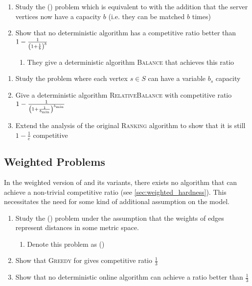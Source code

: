 \begin{enumerate}
    \item Study the \ombmatch{} \textsf{(\ombm{})} problem which is equivalent to \omm{} with the addition that the server vertices now have a capacity $b$ (i.e.\! they can be matched $b$ times)
    \item Show that no deterministic algorithm has a competitive ratio better than $1 - \frac{1}{\left( 1 + \frac{1}{b} \right)^b}$ 
    \begin{enumerate}
        \item They give a deterministic algorithm \textsc{Balance} that achieves this ratio
    \end{enumerate}
\end{enumerate}

\begin{enumerate}
    \item Study the \ombm{} problem where each vertex $s \in S$ can have a variable $b_s$ capacity
    \item Give a deterministic algorithm \textsc{RelativeBalance} with competitive ratio $1 - \frac{1}{\left( 1 + \frac{1}{b_{\min}} \right)^{b_{\min}}}$
    \item Extend the analysis of the original \textsc{Ranking} algorithm to show that it is still $1 - \frac{1}{e}$ competitive 
\end{enumerate}

\subsection{Weighted Problems}

In the weighted version of \omm{} and its \bmatch{} variants, there exists no algorithm that 
can achieve a non-trivial competitive ratio (see \cref{sec:weighted_hardness}). This necessitates the need 
for some kind of additional assumption on the model. 

\begin{enumerate}
    \item Study the \omwmatch{} \textsf{(\omwm{})} problem under the assumption that the weights of edges represent distances in some metric space. 
    \begin{enumerate}
        \item Denote this problem as \momwmatch{} \textsf{(\momwm{})}
    \end{enumerate}
    \item Show that \textsc{Greedy} for \momwm{} gives competitive ratio $\frac{1}{3}$ 
    \item Show that no deterministic online algorithm can achieve a ratio better than $\frac{1}{3}$ 
\end{enumerate}

